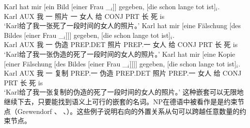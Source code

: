 \eal
\ex 
\gll Karl hat mir [ein Bild [einer Frau \_$_i$]] gegeben, [die schon lange tot ist]$_i$.\\
	 Karl AUX 我  \spacebr{}一 照片  \spacebr{}一 女人 {} 给 \spacebr{}CONJ PRT 长 死 is\\
\glt `Karl给了我一张死了一段时间的女人的照片。'
\ex 
\gll Karl hat mir [eine Fälschung [des Bildes [einer Frau \_$_i$]]] gegeben, [die schon lange tot ist]$_i$.\\
	Karl AUX 我 \spacebr{}一 伪造 \spacebr{}PREP.DET 照片 \spacebr{}PREP.一 女人 {} 给 \spacebr{}CONJ PRT 长 死 is\\
\glt `Karl给了我一张伪造的死了一段时间的女人的照片。'
\ex 
\gll Karl hat mir [eine Kopie [einer Fälschung [des Bildes [einer Frau \_$_i$]]]] gegeben, [die schon lange tot ist]$_i$.\\
	 Karl AUX 我 \spacebr{}一 复制 \spacebr{}PREP.一 伪造 \spacebr{}PREP.DET 照片 \spacebr{}PREP.一 女人 {} 给 \spacebr{}CONJ PRT 长 死 is\\
\glt `Karl给了我一张复制的伪造的死了一段时间的女人的照片。'
\zl
这种嵌套可以无限地继续下去，只要能找到语义上可行的嵌套的名词。NP在德语中被看作是是约束节点（Grewendorf \citeyear[]{Grewendorf88a}、
\citeyear[--18]{Grewendorf2002a}、\citealp[]{Haider2001a}）。这些例子说明右向的外置关系从句可以跨越任意数量的约束节点。


